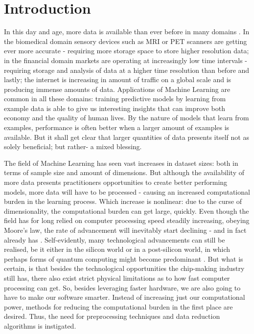 \documentclass[../main.tex]{subfiles}
\begin{document}
\section{Introduction}\label{section:introduction}

In this day and age, more data is available than ever before in many domains \citep{sagiroglu_big_2013}. In the biomedical domain sensory devices such as MRI or PET scanners are getting ever more accurate - requiring more storage space to store higher resolution data; in the financial domain markets are operating at increasingly low time intervals - requiring storage and analysis of data at a higher time resolution than before and lastly; the internet is increasing in amount of traffic on a global scale and is producing immense amounts of data. Applications of Machine Learning are common in all these domains: training predictive models by learning from example data is able to give us interesting insights that can improve both economy and the quality of human lives. By the nature of models that learn from examples, performance is often better when a larger amount of examples is available. But it shall get clear that larger quantities of data presents itself not as solely beneficial; but rather- a mixed blessing.



The field of Machine Learning has seen vast increases in dataset sizes: both in terms of sample size and amount of dimensions. But although the availability of more data presents practitioners opportunities to create better performing models, more data will have to be processed - causing an increased computational burden in the learning process. Which increase is nonlinear: due to the curse of dimensionality, the computational burden can get large, quickly. Even though the field has for long relied on computer processing speed steadily increasing, obeying Moore's law, the rate of advancement will inevitably start declining - and in fact already has \citep{theis_end_2017}. Self-evidently, many technological advancements can still be realised, be it either in the silicon world or in a post-silicon world, in which perhaps forms of quantum computing might become predominant \citep{britt_high-performance_2017}. But what is certain, is that besides the technological opportunities the chip-making industry still has, there also exist strict physical limitations as to how fast computer processing can get. So, besides leveraging faster hardware, we are also going to have to make our software smarter. Instead of increasing just our computational power, methods for reducing the computational burden in the first place are desired. Thus, the need for preprocessing techniques and data reduction algorithms is instigated.
\end{document}

